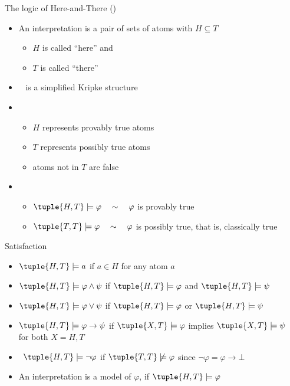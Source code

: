 \begin{frame}{The logic of Here-and-There (\HT)}
  \begin{itemize}
  \item<1-> An \alert{interpretation} is a pair  of sets of atoms with $H \subseteq T$
    \begin{itemize}
    \item $H$ is called ``here'' and
    \item $T$ is called ``there''
    \end{itemize}
  \item<2->  \  is a simplified Kripke structure
    \medskip
  \item<3->  \
    \begin{itemize}
    \item $H$ represents provably true atoms
    \item $T$ represents possibly true atoms
    \item atoms not in $T$ are false
    \end{itemize}
    \medskip
  \item<4-> 
    \begin{itemize}
    \item $\tuple{H,T}\models\varphi\quad \sim\quad \varphi$ is provably true
    \item $\tuple{T,T}\models\varphi\quad \sim\quad \varphi$ is possibly true\pause[5], that is, classically true
    \end{itemize}
  \end{itemize}
\end{frame}
\begin{frame}{Satisfaction}
  \begin{itemize}
  \item $\tuple{H,T} \models a$ if $a \in H$ \hfill for any atom $a$
  \item $\tuple{H,T} \models \varphi \wedge \psi$ if
    $\tuple{H,T} \models \varphi$
    and
    $\tuple{H,T} \models \psi$
  \item $\tuple{H,T} \models \varphi \vee \psi$ if
    $\tuple{H,T} \models \varphi$
    or
    $\tuple{H,T} \models \psi$

    \smallskip

  \item $\tuple{H,T} \models \varphi \rightarrow \psi$ if
    $\tuple{X,T} \models \varphi$ implies $\tuple{X,T} \models \psi$
    \\\qquad\qquad
    for both $X=H,T$

    \bigskip

  \item<2>  \ $\tuple{H,T} \models \neg\varphi$ if $\tuple{T,T} \not\models \varphi$
    \hfill since $\neg\varphi = \varphi\to\bot$

    \bigskip

  \item<3-> An interpretation  is a \alert{model} of $\varphi$, if $\tuple{H,T} \models \varphi$
  \end{itemize}
\end{frame}
